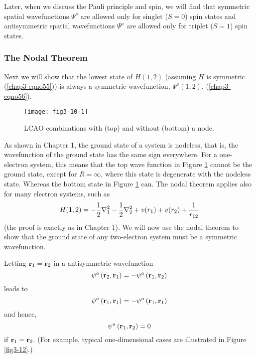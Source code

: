 Later, when we discuss the Pauli principle and spin, we will find that
symmetric spatial wavefunctions $\Psi^s$ are allowed only for singlet
($S = 0$) spin states and antisymmetric spatial wavefunctions $\Psi^a$
are allowed only for triplet ($S = 1$) spin states.

\subsubsection{The Nodal Theorem}

Next we will show that the lowest state of $H(1,2)$ (assuming $H$ is
symmetric (\ref{chap3-eqno55})) is always a symmetric wavefunction,
$\Psi^s (1 , 2)$, (\ref{chap3-eqno56}).

\begin{figure}
\texttt{[image: fig3-10-1]}
\caption{LCAO combinations with (top) and without (bottom) a node.}
\label{fig3-10-1}
\end{figure}

As shown in Chapter 1, the ground state of a system is nodeless, that is, 
the wavefunction of the ground state has the same sign everywhere. For a 
one-electron system, this means that the top wave function in Figure
\ref{fig3-10-1} cannot be the ground state, except for $R = \infty$,
where this state is degenerate with the nodeless state.  Whereas
the bottom state in Figure \ref{fig3-10-1} can.  The nodal theorem
applies also for many electron systems, such as 
\begin{equation}
H (1,2) = - {1 \over 2} \nabla^2_1 - {1 \over 2} \nabla^2_2 + 
v(r_1) + v(r_2) + {1 \over r_{12}}
\label{chap3-eqno57}
\end{equation}
(the proof is exactly as in Chapter 1). We will now use the nodal
theorem to show that the ground state of any two-electron system must
be a symmetric wavefunction.

Letting ${\bf r}_1 = {\bf r}_2$ in a antisymmetric wavefunction
\begin{equation}
\psi^a \left( {\bf r}_2 , {\bf r}_1 \right) = - \psi^a \left( {\bf 
r}_1 , {\bf r}_2 \right)
\end{equation}
leads to
\begin{equation}
\psi^a \left( {\bf r}_1 , {\bf r}_1 \right) = - \psi^a \left( {\bf
r}_1 , {\bf r}_1 \right)
\end{equation}
and hence,
\begin{equation}
\psi^a \left( {\bf r}_1 , {\bf r}_2 \right) =0
\end{equation}
if ${\bf r}_1 = {\bf r}_2$.  (For example, typical one-dimensional cases 
are illustrated in  Figure \ref{fig3-12}.)

